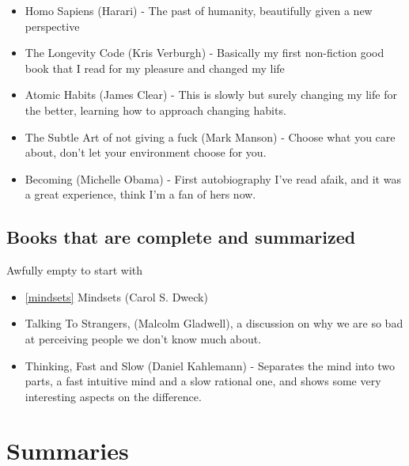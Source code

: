 \documentclass[12pt,a4paper]{article} %
\begin{document}
\begin{itemize}
\item Homo Sapiens (Harari) - The past of humanity, beautifully given a new perspective
\item The Longevity Code (Kris Verburgh) - Basically my first non-fiction good book that I read for my pleasure and changed my life
\item Atomic Habits (James Clear) - This is slowly but surely changing my life for the better, learning how to approach changing habits.
\item The Subtle Art of not giving a fuck (Mark Manson) - Choose what you care about, don't let your environment choose for you.
\item Becoming (Michelle Obama) - First autobiography I've read afaik, and it was a great experience, think I'm a fan of hers now.
\end{itemize}

\subsection{Books that are complete and summarized}
Awfully empty to start with
\begin{itemize}
\item \ref{mindsets} Mindsets (Carol S. Dweck)
\item Talking To Strangers, (Malcolm Gladwell), a discussion on why we are so bad at perceiving people we don't know much about.
\item Thinking, Fast and Slow (Daniel Kahlemann) - Separates the mind into two parts, a fast intuitive mind and a slow rational one, and shows some very interesting aspects on the difference.
\end{itemize}


\section{Summaries}














\end{document}
